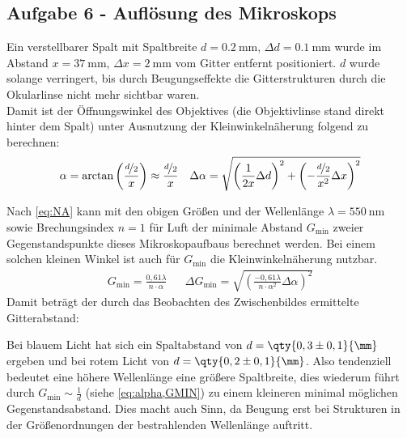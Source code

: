 \subsection{Aufgabe 6 - Auflösung des Mikroskops}
Ein verstellbarer Spalt mit Spaltbreite \(d=\qty{0,2}{\mm}\), \(\Delta d=\qty{0,1}{\mm}\) wurde im Abstand \(x=\qty{37}{\mm}\), \(\Delta x=\qty{2}{\mm}\) vom Gitter entfernt positioniert. \(d\) wurde solange verringert, bis durch Beugungseffekte die Gitterstrukturen durch die Okularlinse nicht mehr sichtbar waren.\\
Damit ist der Öffnungswinkel des Objektives (die Objektivlinse stand direkt hinter dem Spalt) unter Ausnutzung der Kleinwinkelnäherung folgend zu berechnen:
\begin{align}
    \alpha=\text{arctan}\left(\frac{\nicefrac{d}{2}}{x}\right)\approx\frac{\nicefrac{d}{2}}{x}
    \label{eq:alpha}
    && \Delta \alpha=\sqrt{\left(\frac{1}{2x}\Delta d\right)^{2}+\left(-\frac{\nicefrac{d}{2}}{x^{2}}\Delta x\right)^{2}}
\end{align}

Nach \cref{eq:NA} kann mit den obigen Größen und der Wellenlänge \(\lambda=\qty{550}{\nm}\) sowie Brechungsindex \(n=1\) für Luft der minimale Abstand \(G_{\text{min}}\) zweier Gegenstandspunkte dieses Mikroskopaufbaus berechnet werden.
Bei einem solchen kleinen Winkel ist auch für \(G_{\text{min}}\) die Kleinwinkelnäherung nutzbar. 
\begin{align}
    G_{\text{min}}=\frac{0,61\lambda}{n\cdot\alpha}&&
    \label{GMIN}
    \Delta G_{\text{min}}=\sqrt{\left(\frac{-0,61\lambda}{n\cdot\alpha^{2}}\Delta \alpha\right)^{2}}
\end{align}
Damit beträgt der durch das Beobachten des Zwischenbildes ermittelte Gitterabstand:\\

Bei blauem Licht hat sich ein Spaltabstand von \(d=\qty{0,3 \pm 0,1}{\mm}\) ergeben und bei rotem Licht von \(d=\qty{0,2 \pm 0,1}{\mm}\). Also tendenziell bedeutet eine höhere Wellenlänge eine größere Spaltbreite, dies wiederum führt durch \(G_{\text{min}}\sim\frac{1}{d}\) (siehe \cref{eq:alpha,GMIN}) zu einem kleineren minimal möglichen Gegenstandsabstand. Dies macht auch Sinn, da Beugung erst bei Strukturen in der Größenordnungen der bestrahlenden Wellenlänge auftritt.